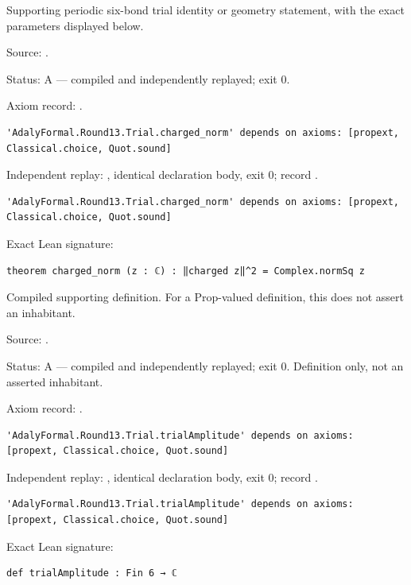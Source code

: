 \begin{theorem}[bp-354]
\label{bp-354}
\leanok
Supporting periodic six-bond trial identity or geometry statement, with the exact parameters displayed below.

\par Source: \texttt{}.
\par Status: A — compiled and independently replayed; exit 0.
\par Axiom record: \texttt{}.
\begin{verbatim}
'AdalyFormal.Round13.Trial.charged_norm' depends on axioms: [propext, Classical.choice, Quot.sound]
\end{verbatim}
\par Independent replay: \texttt{}, identical declaration body, exit 0; record \texttt{}.
\begin{verbatim}
'AdalyFormal.Round13.Trial.charged_norm' depends on axioms: [propext, Classical.choice, Quot.sound]
\end{verbatim}
\par Exact Lean signature:
\begin{verbatim}
theorem charged_norm (z : ℂ) : ‖charged z‖^2 = Complex.normSq z
\end{verbatim}
\end{theorem}

\begin{definition}[bp-355]
\label{bp-355}
\uses{}
\leanok
Compiled supporting definition. For a Prop-valued definition, this does not assert an inhabitant.

\par Source: \texttt{}.
\par Status: A — compiled and independently replayed; exit 0. Definition only, not an asserted inhabitant.
\par Axiom record: \texttt{}.
\begin{verbatim}
'AdalyFormal.Round13.Trial.trialAmplitude' depends on axioms: [propext, Classical.choice, Quot.sound]
\end{verbatim}
\par Independent replay: \texttt{}, identical declaration body, exit 0; record \texttt{}.
\begin{verbatim}
'AdalyFormal.Round13.Trial.trialAmplitude' depends on axioms: [propext, Classical.choice, Quot.sound]
\end{verbatim}
\par Exact Lean signature:
\begin{verbatim}
def trialAmplitude : Fin 6 → ℂ
\end{verbatim}
\end{definition}


